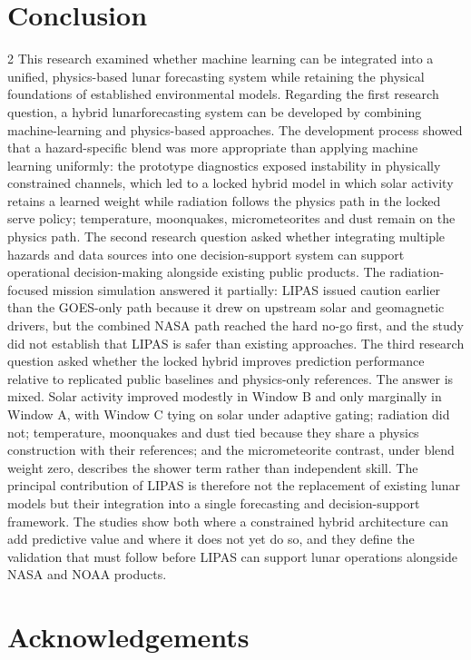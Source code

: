 \section{Conclusion}
\begin{multicols}{2}
This research examined whether machine learning can be integrated into a unified, physics-based lunar forecasting system while retaining the physical foundations of established environmental models. Regarding the first research question, a hybrid lunarforecasting system can be developed by combining machine-learning and physics-based approaches. The development process showed that a hazard-specific blend was more appropriate than applying machine learning uniformly: the prototype diagnostics exposed instability in physically constrained channels, which led to a locked hybrid model in which solar activity retains a learned weight while radiation follows the physics path in the locked serve policy; temperature, moonquakes, micrometeorites and dust remain on the physics path. The second research question asked whether integrating multiple hazards and data sources into one decision-support system can support operational decision-making alongside existing public products. The radiation-focused mission simulation answered it partially: LIPAS issued caution earlier than the GOES-only path because it drew on upstream solar and geomagnetic drivers, but the combined NASA path reached the hard no-go first, and the study did not establish that LIPAS is safer than existing approaches. The third research question asked whether the locked hybrid improves prediction performance relative to replicated public baselines and physics-only references. The answer is mixed. Solar activity improved modestly in Window B and only marginally in Window A, with Window C tying on solar under adaptive gating; radiation did not; temperature, moonquakes and dust tied because they share a physics construction with their references; and the micrometeorite contrast, under blend weight zero, describes the shower term rather than independent skill. The principal contribution of LIPAS is therefore not the replacement of existing lunar models but their integration into a single forecasting and decision-support framework. The studies show both where a constrained hybrid architecture can add predictive value and where it does not yet do so, and they define the validation that must follow before LIPAS can support lunar operations alongside NASA and NOAA products.

\section*{Acknowledgements}


\end{multicols}
